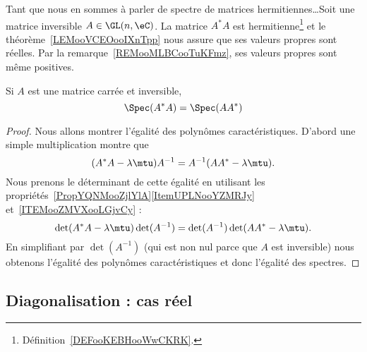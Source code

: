 Tant que nous en sommes à parler de spectre de matrices hermitiennes\ldots Soit une matrice inversible \( A\in \GL(n,\eC)\). La matrice \( A^*A\) est hermitienne\footnote{Définition~\ref{DEFooKEBHooWwCKRK}.} et le théorème~\ref{LEMooVCEOooIXnTpp} nous assure que ses valeurs propres sont réelles. Par la remarque~\ref{REMooMLBCooTuKFmz}, ses valeurs propres sont même positives.

\begin{lemma}   \label{LEMooHUGEooVYhZdZ}
    Si \( A\) est une matrice carrée et inversible,
    \begin{equation}
        \Spec(A^*A)=\Spec(AA^*)
    \end{equation}
\end{lemma}

\begin{proof}
    Nous allons montrer l'égalité des polynômes caractéristiques. D'abord une simple multiplication montre que
    \begin{equation}
        (A^*A-\lambda\mtu)A^{-1}=A^{-1}(AA^*-\lambda\mtu).
    \end{equation}
    Nous prenons le déterminant de cette égalité en utilisant les propriétés~\ref{PropYQNMooZjlYlA}\ref{ItemUPLNooYZMRJy} et~\ref{ITEMooZMVXooLGjvCy} :
    \begin{equation}
        \det(A^*A-\lambda\mtu)\det(A^{-1})=\det(A^{-1})\det(AA^*-\lambda\mtu).
    \end{equation}
    En simplifiant par \( \det(A^{-1})\) (qui est non nul parce que \( A\) est inversible) nous obtenons l'égalité des polynômes caractéristiques et donc l'égalité des spectres.
\end{proof}

\subsection{Diagonalisation : cas réel}


